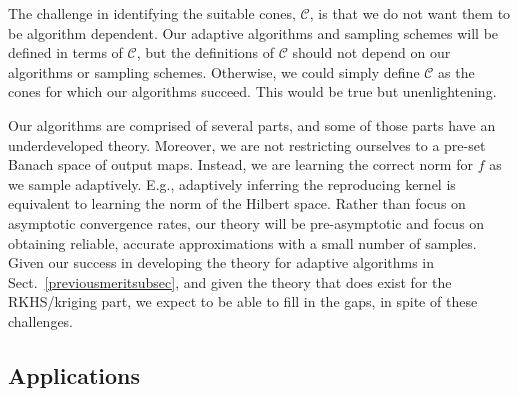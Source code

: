 \documentclass[11pt]{NSFamsart}
\newcommand{\calc}{{\mathcal{C}}}
\begin{document}
The challenge in identifying the suitable cones, $\calc$, is that we do not want them to be algorithm dependent. Our adaptive algorithms and sampling schemes will be defined in terms of $\calc$, but the definitions of $\calc$ should not depend on our algorithms or sampling schemes. Otherwise, we could simply define $\calc$ as the cones for which our algorithms succeed. This would be true but unenlightening.

Our algorithms are comprised of several parts, and some of those parts have an underdeveloped theory. Moreover, we are not restricting ourselves to a pre-set Banach space of output maps. Instead, we are learning the correct norm for $f$ as we sample adaptively. E.g., adaptively inferring the reproducing kernel is equivalent to learning the norm of the Hilbert space. Rather than focus on asymptotic convergence rates, our theory will be pre-asymptotic and focus on obtaining reliable, accurate approximations with a small number of samples. Given our success in developing the theory for adaptive algorithms in Sect.\ \ref{previousmeritsubsec}, and given the theory that does exist for the RKHS/kriging part, we expect to be able to fill in the gaps, in spite of these challenges.


\subsection{Applications} \label{sec:Applications}

\end{document}
